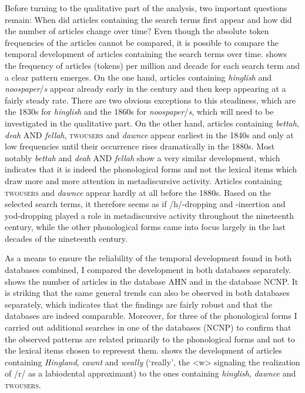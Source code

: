 Before turning to the qualitative part of the analysis, two important questions remain: When did articles containing the search terms first appear and how did the number of articles change over time? Even though the absolute token frequencies of the articles cannot be compared, it is possible to compare the temporal development of articles containing the search terms over time.  shows the frequency of articles (tokens) per million and decade for each search term and a clear pattern emerges. On the one hand, articles containing \emph{hinglish} and \emph{noospaper}/\emph{s} appear already early in the century and then keep appearing at a fairly steady rate. There are two obvious exceptions to this steadiness, which are the 1830s for \emph{hinglish} and the 1860s for \emph{noospaper}/\emph{s}, which will need to be investigated in the qualitative part. On the other hand, articles containing \emph{bettah}, \emph{deah} AND \emph{fellah}, \textsc{twousers} and \emph{dawnce} appear earliest in the 1840s and only at low frequencies until their occurrence rises dramatically in the 1880s. Most notably \emph{bettah} and \emph{deah} AND \emph{fellah} show a very similar development, which indicates that it is indeed the phonological forms and not the lexical items which draw more and more attention in metadiscursive activity. Articles containing \textsc{twousers} and \emph{dawnce} appear hardly at all before the 1880s. Based on the selected search terms, it therefore seems as if /h/-dropping and -insertion and yod-dropping played a role in metadiscursive activity throughout the nineteenth century, while the other phonological forms came into focus largely in the last decades of the nineteenth century.


As a means to ensure the reliability of the temporal development found in both databases combined, I compared the development in both databases separately.  shows the number of articles in the database AHN and  in the database NCNP. It is striking that the same general trends can also be observed in both databases separately, which indicates that the findings are fairly robust and that the databases are indeed comparable. Moreover, for three of the phonological forms I carried out additional searches in one of the databases (NCNP) to confirm that the observed patterns are related primarily to the phonological forms and not to the lexical items chosen to represent them.  shows the development of articles containing \emph{Hingland}, \emph{cawnt} and \emph{weally} (‘really’, the <w> signaling the realization of /r/ as a labiodental approximant) to the ones containing \emph{hinglish}, \emph{dawnce} and \textsc{twousers}.



